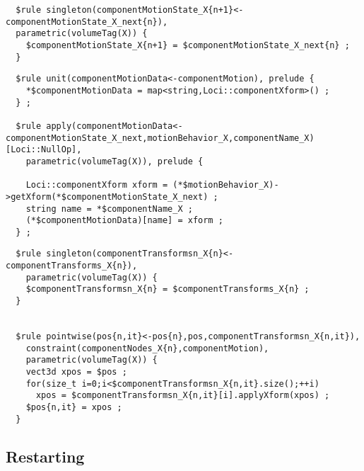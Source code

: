 \documentclass{article}
\begin{document}
\begin{verbatim}
  $rule singleton(componentMotionState_X{n+1}<-componentMotionState_X_next{n}),
  parametric(volumeTag(X)) {
    $componentMotionState_X{n+1} = $componentMotionState_X_next{n} ;
  }
\end{verbatim}

\begin{verbatim}
  $rule unit(componentMotionData<-componentMotion), prelude {
    *$componentMotionData = map<string,Loci::componentXform>() ;
  } ;

  $rule apply(componentMotionData<-componentMotionState_X_next,motionBehavior_X,componentName_X)[Loci::NullOp],
    parametric(volumeTag(X)), prelude {

    Loci::componentXform xform = (*$motionBehavior_X)->getXform(*$componentMotionState_X_next) ;
    string name = *$componentName_X ;
    (*$componentMotionData)[name] = xform ;
  } ;
\end{verbatim}

\begin{verbatim}
  $rule singleton(componentTransformsn_X{n}<-componentTransforms_X{n}),
    parametric(volumeTag(X)) {
    $componentTransformsn_X{n} = $componentTransforms_X{n} ;
  }
  

  $rule pointwise(pos{n,it}<-pos{n},pos,componentTransformsn_X{n,it}),
    constraint(componentNodes_X{n},componentMotion),
    parametric(volumeTag(X)) {
    vect3d xpos = $pos ;
    for(size_t i=0;i<$componentTransformsn_X{n,it}.size();++i)
      xpos = $componentTransformsn_X{n,it}[i].applyXform(xpos) ;
    $pos{n,it} = xpos ;
  }    
\end{verbatim}

\subsection{Restarting}
\end{document}
